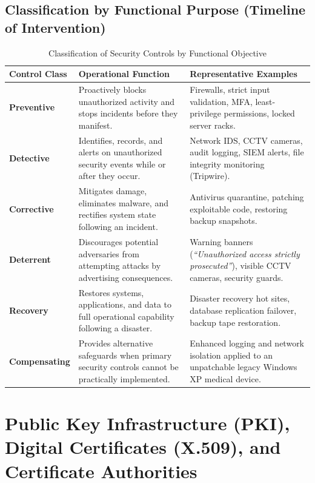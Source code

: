 \subsection{Classification by Functional Purpose (Timeline of Intervention)}

\begin{table}[htbp]
\centering
\caption{Classification of Security Controls by Functional Objective}
\label{tab:controls_functional}
\begin{tabularx}{\textwidth}{p{2.8cm} X X}
\toprule
\textbf{Control Class} & \textbf{Operational Function} & \textbf{Representative Examples} \\
\midrule
\textbf{Preventive} & Proactively blocks unauthorized activity and stops incidents before they manifest. & Firewalls, strict input validation, MFA, least-privilege permissions, locked server racks. \\
\textbf{Detective} & Identifies, records, and alerts on unauthorized security events while or after they occur. & Network IDS, CCTV cameras, audit logging, SIEM alerts, file integrity monitoring (Tripwire). \\
\textbf{Corrective} & Mitigates damage, eliminates malware, and rectifies system state following an incident. & Antivirus quarantine, patching exploitable code, restoring backup snapshots. \\
\textbf{Deterrent} & Discourages potential adversaries from attempting attacks by advertising consequences. & Warning banners (\textit{``Unauthorized access strictly prosecuted''}), visible CCTV cameras, security guards. \\
\textbf{Recovery} & Restores systems, applications, and data to full operational capability following a disaster. & Disaster recovery hot sites, database replication failover, backup tape restoration. \\
\textbf{Compensating} & Provides alternative safeguards when primary security controls cannot be practically implemented. & Enhanced logging and network isolation applied to an unpatchable legacy Windows XP medical device. \\
\bottomrule
\end{tabularx}
\end{table}

\newpage
\section{Public Key Infrastructure (PKI), Digital Certificates (X.509), and Certificate Authorities}

